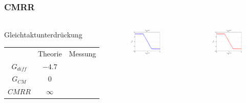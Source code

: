 \begin{frame}
\frametitle{CMRR}
\framesubtitle{}
    \begin{columns}[c]
    \begin{block}{Gleichtaktunterdrückung}
        \begin{tabular}{c|c|c}
            &Theorie&Messung\\
            $G_{diff}$ & $-4.7$ & \\
            $G_{CM}$ & $0$ & \\
            $CMRR$ & $\infty$ & 
        \end{tabular}
    \end{block}
    \begin{figure}[H]
    \begin{center}
            \includegraphics[scale=0.3]{./img/plots/Auf_3_Ucm_0.eps}
    \end{center}
    \end{figure}
    \begin{figure}[H]
    \begin{center}
            \includegraphics[scale=0.3]{./img/plots/Auf_3_Ucm_5.eps}

\end{center}
\end{figure}
\end{columns}
\end{frame}
